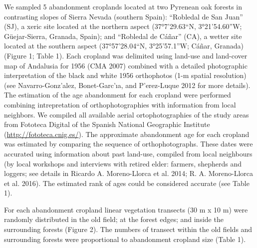 \documentclass[
]{article}
\begin{document}
We sampled 5 abandonment croplands located at two Pyrenean oak forests
in contrasting slopes of Sierra Nevada (southern Spain): ``Robledal de
San Juan'' (SJ), a xeric site located at the northern aspect
(37°7'29.63``N, 3°21'54.60''W; Güejar-Sierra, Granada, Spain); and
``Robledal de Cáñar'' (CA), a wetter site located at the southern aspect
(37°57'28.04``N, 3°25'57.1''W; Cáñar, Granada) (Figure 1; Table 1). Each
cropland was delimited using land-use and land-cover map of Andalusia
for 1956 (CMA 2007) combined with a detailed photographic interpretation
of the black and white 1956 orthophotos (1-m spatial resolution) (see
Navarro-Gonz'alez, Bonet-Garc'ıa, and P'erez-Luque 2012 for more
details). The estimation of the age abandonment for each cropland were
performed combining intrepretation of orthophotographies with
information from local neighbors. We compiled all available aerial
ortophotographies of the study areas from Fototeca Digital of the
Spanish National Geographic Institute (\url{http://fototeca.cnig.es/}).
The approximate abandonment age for each cropland was estimated by
comparing the sequence of orthophotographs. These dates were accurated
using information about past land-use, compiled from local neighbours
(by local workshops and interviews with retired elder: farmers,
shepherds and loggers; see details in Ricardo A. Moreno-Llorca et al.
2014; R. A. Moreno-Llorca et al. 2016). The estimated rank of ages could
be considered accurate (see Table 1).

For each abandonment cropland linear vegetation transects (30 m x 10 m)
were randomly distributed in the old field; at the forest edges; and
inside the surrounding forests (Figure 2). The numbers of transect
within the old fields and surrounding forests were proportional to
abandonment cropland size (Table 1).

\begin{table}

\caption{\label{tab:croplands}Abandonment cropland features}
\centering
{}
\end{table}
\end{document}
